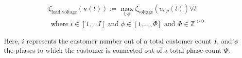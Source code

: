 \begin{equation}
\begin{split}
	\zeta_\text{load voltage}(\textbf{v}(t)) := \max_{i,\phi}{\zeta_\text{voltage}(v_{i,p}(t))} \forall t \\
	\text{ where } i \in [1, \dots I] \text{ and } \phi \in [1, \dots, \Phi] \text{ and } \Phi \in \mathbb{Z}^{>0}
\end{split}
\label{ch1:equ:load-voltage-deviation}
\end{equation}

Here, $i$ represents the customer number out of a total customer count $I$, and $\phi$ the phases to which the customer is connected out of a total phase count $\Phi$.
